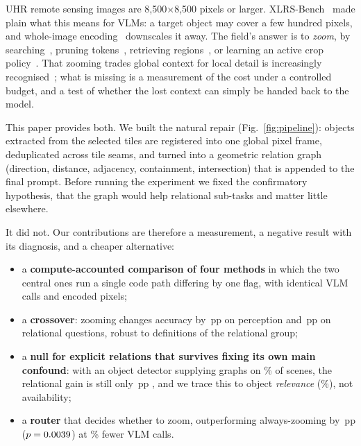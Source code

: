 \documentclass[runningheads]{llncs}
\newcommand{\pp}{\,pp}
\begin{document}
UHR remote sensing images are 8,500$\times$8,500 pixels or larger. XLRS-Bench~\cite{wang2025xlrs} made plain what this means for VLMs: a target object may cover a few hundred pixels, and whole-image encoding~\cite{bai2025qwen25vl} downscales it away. The field's answer is to \emph{zoom}, by searching~\cite{wu2024vstar,shen2024zoomeye}, pruning tokens~\cite{luo2025lrsvqa}, retrieving regions~\cite{zhang2024imagerag}, or learning an active crop policy~\cite{liu2025zoomearth}. That zooming trades global context for local detail is increasingly recognised~\cite{tran2026lookbefore,wang2026beyondzooming}; what is missing is a measurement of the cost under a controlled budget, and a test of whether the lost context can simply be handed back to the model.

This paper provides both. We built the natural repair (Fig.~\ref{fig:pipeline}): objects extracted from the selected tiles are registered into one global pixel frame, deduplicated across tile seams, and turned into a geometric relation graph (direction, distance, adjacency, containment, intersection) that is appended to the final prompt. Before running the experiment we fixed the confirmatory hypothesis, that the graph would help relational sub-tasks and matter little elsewhere.

It did not. Our contributions are therefore a measurement, a negative result with its diagnosis, and a cheaper alternative:
\begin{itemize}
\item a \textbf{compute-accounted comparison of four methods} in which the two central ones run a single code path differing by one flag, with identical VLM calls and encoded pixels;
\item a \textbf{crossover}: zooming changes accuracy by \dOTNon\pp{} on perception and \dOTRel\pp{} on relational questions, robust to \nPartitions{} definitions of the relational group;
\item a \textbf{null for explicit relations that survives fixing its own main confound}: with an object detector supplying graphs on \gDcross\% of scenes, the relational gain is still only \relDRel\pp{} \relDRelci, and we trace this to object \emph{relevance} (\detKwShare\%), not availability;
\item a \textbf{router} that decides whether to zoom, outperforming always-zooming by \routerDelta\pp{} ($p=0.0039$) at \routerSaving\% fewer VLM calls.
\end{itemize}

\end{document}
